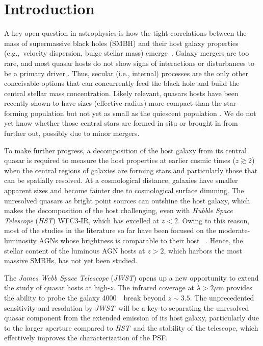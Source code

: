 \documentclass[twocolumn]{aastex631}
\newcommand{\hst}{{\it HST}}
\newcommand{\jwst}{{\it JWST}}
\newcommand{\angstrom}{\text{\normalfont\AA}}
\begin{document}
\section{Introduction} \label{sec:intro}

A key open question in astrophysics is how the tight correlations between the mass of supermassive black holes (SMBH) and their host galaxy properties (e.g.,~velocity dispersion, bulge stellar mass) emerge~\citep[e.g.,~][]{Mag++98, F+M00, M+H03, H+R04, Gul++09, Geb++01b, Gra++2011,Beifi2012}. Galaxy mergers are too rare, and most quasar hosts do not show signs of interactions or disturbances to be a primary driver \citep[e.g.,][]{Cisternas2011,Kocevski2012,Mechtley2016}. Thus, secular (i.e., internal) processes are the only other conceivable options that can concurrently feed the black hole and build the central stellar mass concentration. Likely relevant, quasars hosts have been recently shown to have sizes (effective radius) more compact than the star-forming population but not yet as small as the quiescent population \citep{Silverman2019,Li2021}. We do not yet know whether those central stars are formed in situ or brought in from further out, possibly due to minor mergers. 


To make further progress, a decomposition of the host galaxy from its central quasar is required to measure the host properties at earlier cosmic times ($z\gtrsim2$) when the central regions of galaxies are forming stars and particularly those that can be spatially resolved. At a cosmological distance, galaxies have smaller apparent sizes and become fainter due to cosmological surface dimming. The unresolved quasars as bright point sources can outshine the host galaxy, which makes the decomposition of the host challenging, even with {\it Hubble Space Telescope} (\hst) WFC3-IR, which has excelled at $z < 2$. Owing to this reason, most of the studies in the literature so far have been focused on the moderate-luminosity AGNs whose brightness is comparable to their host ~\citep{Park15, Tre++07, Bennert11, Woo++08, Jah++09, SS13, Mechtley2016,Ding2020, Ding2021, 2021ApJ...906..103L}. Hence, the stellar content of the luminous AGN hosts at $z>2$, which harbors the most massive SMBHs, has not yet been studied. 

The {\it James Webb Space Telescope} (\jwst) opens up a new opportunity to extend the study of quasar hosts at high-$z$. The infrared coverage at $\lambda > 2 \mu$m provides the ability to probe the galaxy 4000~\angstrom\ break beyond $z\sim 3.5$.  The unprecedented sensitivity and resolution by \jwst\ will be a key to separating the unresolved quasar component from the extended emission of its host galaxy, particularly due to the larger aperture compared to \hst\ and the stability of the telescope, which effectively improves the characterization of the PSF. 
\end{document}
